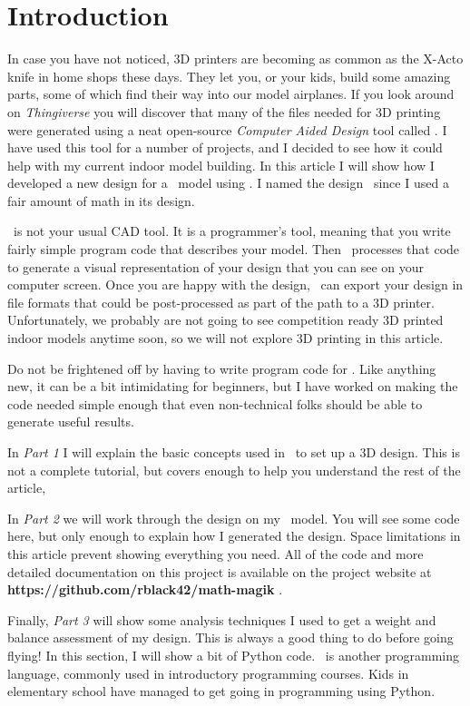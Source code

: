\section{Introduction}

In case you have not noticed, 3D printers are becoming as common as the X-Acto
knife in home shops these days. They let you, or your kids, build some amazing
parts, some of which find their way into our model airplanes. If you look
around on {\it Thingiverse} \cite{thingy} you will discover that many of the
files needed for 3D printing were generated using a neat open-source {\it
Computer Aided Design} tool called \osc. I have used this tool for a number of
projects, and I decided to see how it could help with my current indoor model
building. In this article I will show how I developed a new design for a \LPP\ model
using \osc. I named the design \MM\ since I used a fair amount of math in its
design.

\osc\ is not your usual CAD tool. It is a programmer's tool, meaning that you
write fairly simple program code that describes your model. Then \osc\ processes
that code to generate a visual representation of your design that you can see on
your computer screen. Once you are happy with the design, \osc\ can export your
design in file formats that could be post-processed as part of the path to a 3D
printer. Unfortunately, we probably are not going to see competition ready 3D
printed indoor models anytime soon, so we will not explore 3D printing in this
article.

Do not be frightened off by having to write program code for \osc. Like
anything new, it can be a bit intimidating for beginners, but I have worked on
making the code needed simple enough that even non-technical folks should be
able to generate useful results.

In {\it Part 1} I will explain the basic concepts used in \osc\ to set up a 3D
design. This is not a complete tutorial, but covers enough to help you
understand the rest of the article,

In {\it Part 2} we will work through the design on my \LPP\ model. You will see
some code here, but only enough to explain how I generated the design. Space
limitations in this article prevent showing everything you need. All of the
code and more detailed documentation on this project is available on the
project website at {\bf https://github.com/rblack42/math-magik} \cite{blackr}.

Finally, {\it Part 3} will show some analysis techniques I used to get a weight
and balance assessment of my design.  This is always a good thing to do before
going flying! In this section, I will show a bit of Python code. \PY\ is
another programming language, commonly used in introductory programming
courses. Kids in elementary school have managed to get going in programming
using Python.






